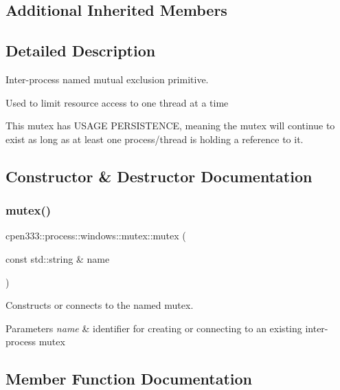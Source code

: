 \subsection*{Additional Inherited Members}


\subsection{Detailed Description}
Inter-\/process named mutual exclusion primitive. 

Used to limit resource access to one thread at a time

This mutex has U\+S\+A\+GE P\+E\+R\+S\+I\+S\+T\+E\+N\+CE, meaning the mutex will continue to exist as long as at least one process/thread is holding a reference to it. 

\subsection{Constructor \& Destructor Documentation}
\mbox{\label{classcpen333_1_1process_1_1windows_1_1mutex_a6bd2d0c07f83dd5646cbdbadbfc8fc58}} 
\subsubsection{\texorpdfstring{mutex()}{mutex()}}
{\footnotesize\ttfamily cpen333\+::process\+::windows\+::mutex\+::mutex (\begin{DoxyParamCaption}\item[{const std\+::string \&}]{name }\end{DoxyParamCaption})\hspace{0.3cm}{\ttfamily [inline]}}



Constructs or connects to the named mutex. 


\begin{DoxyParams}{Parameters}
{\em name} & identifier for creating or connecting to an existing inter-\/process mutex \\
\hline
\end{DoxyParams}


\subsection{Member Function Documentation}
\mbox{\label{classcpen333_1_1process_1_1windows_1_1mutex_a887f0647207b0e0fa1bead1500c95aec}} 

